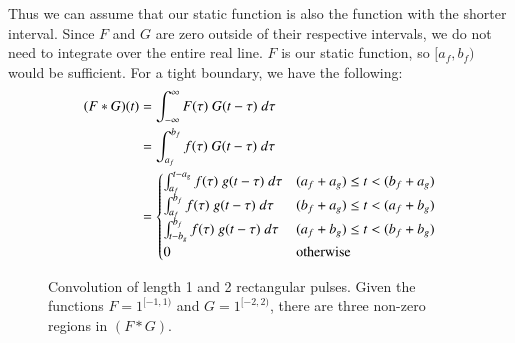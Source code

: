 Thus we can assume that our static function is also the function with the shorter interval.
Since $F$ and $G$ are zero outside of their respective intervals, we do not need to integrate over the entire real line. 
$F$ is our static function, so $[a_f, b_f)$ would be sufficient.
For a tight boundary, we have the following:
\begin{align}
	\label{eqn:ConvNaiveOnePiece}
	(F*G)(t) 
	&= \int_{-\infty}^\infty F(\tau)\; G(t-\tau) \; d\tau \notag \\
	&= \int_{a_f}^{b_f} f(\tau) \; G(t-\tau) \; d\tau \notag \\
	&= 	\begin{cases}
			\int_{a_f}^{t-a_g} f(\tau) \; g(t-\tau) \; d\tau 	& (a_f+a_g) \leq t < (b_f+a_g) \\
			\int_{a_f}^{b_f} f(\tau) \; g(t-\tau) \; d\tau		& (b_f+a_g) \leq t < (a_f+b_g) \\
			\int_{t-b_g}^{b_f} f(\tau) \; g(t-\tau) \; d\tau	& (a_f+b_g) \leq t < (b_f+b_g) \\
			0										& \text{otherwise}
		\end{cases}
\end{align}


\begin{figure}[ht]
	\caption[Convolution of ``one-piece'' functions]{Convolution of length 1 and 2 rectangular pulses. 
	Given the functions $F=1^{[-1,1)}$ and $G=1^{[-2,2)}$, there are three non-zero regions in $(F*G)$.
	\label{fig:OnePiece}}
	\centering
\end{figure}


